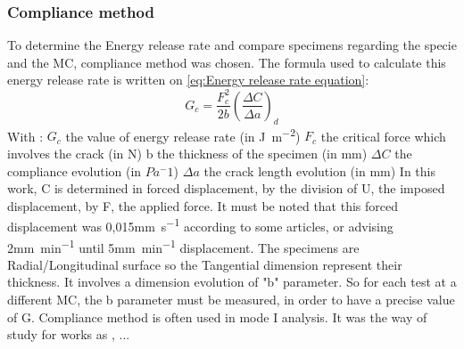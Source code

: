 \documentclass[3p,times,procedia]{elsarticle}
\begin{document}


\subsubsection{Compliance method}\label{Ss:complmet}

To determine the Energy release rate and compare specimens regarding the specie and the MC, compliance method was chosen. 
The formula used to calculate this energy release rate is written on \ref{eq:Energy release rate equation}:
\begin{equation}
	G_{c}= \frac{F_{c}^2}{2b} (\frac{\Delta C}{\Delta a})_{d} 	
	\label{eq:Energy release rate equation}
\end{equation}  
With : 
$G_c$ the value of energy release rate (in \si{\joule\per\square\meter})
$F_c$ the critical force which involves the crack (in \si{\newton})
b the thickness of the specimen (in \si{\milli\meter})
$\Delta C$ the compliance evolution (in $Pa^-1$)
$\Delta a$ the crack length evolution (in \si{\milli\meter})
In this work, C is determined in forced displacement, by the division of U, the imposed displacement, by F, the applied force. It must be noted that this forced displacement was 0,015\si{\milli\meter\per\second} according to some articles, \cite{Reference7} or \cite{reference15} advising 2\si{\milli\meter\per\minute} until 5\si{\milli\meter\per\minute} displacement.
The specimens are Radial/Longitudinal surface so the Tangential dimension represent their thickness. It involves a dimension evolution of "b" parameter. So for each test at a different MC, the b parameter must be measured, in order to have a precise value of G. Compliance method is often used in mode I analysis. It was the way of study for works as \cite{Reference7}, \cite{Ang2017}...
\end{document}
